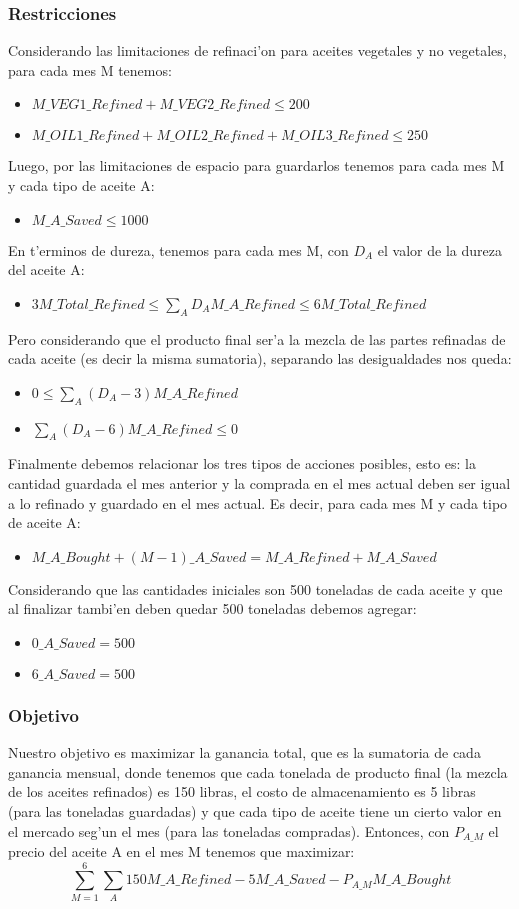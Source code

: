 \subsubsection{Restricciones}
Considerando las limitaciones de refinaci'on para aceites vegetales y no vegetales, para cada mes M tenemos:
\begin{itemize}
\item$M\_VEG1\_Refined + M\_VEG2\_Refined \leq 200$
\item$M\_OIL1\_Refined + M\_OIL2\_Refined + M\_OIL3\_Refined \leq 250$
\end{itemize}
Luego, por las limitaciones de espacio para guardarlos tenemos para cada mes M y cada tipo de aceite A:
\begin{itemize}
\item$M\_A\_Saved \leq 1000$
\end{itemize}
En t'erminos de dureza, tenemos para cada mes M, con $D_A$ el valor de la dureza del aceite A:
\begin{itemize}
\item$3 M\_Total\_Refined \leq  \sum_{A}^{} D_{A} M\_A\_Refined \leq 6 M\_Total\_Refined$
\end{itemize}
Pero considerando que el producto final ser'a la mezcla de las partes refinadas de cada aceite (es decir la misma sumatoria), separando las desigualdades nos queda:
\begin{itemize}
\item$0 \leq  \sum_{A}^{} (D_{A} - 3) M\_A\_Refined$
\item$\sum_{A}^{} (D_{A} - 6) M\_A\_Refined \leq 0$
\end{itemize}
Finalmente debemos relacionar los tres tipos de acciones posibles, esto es: la cantidad guardada el mes anterior y la comprada en el mes actual deben ser igual a lo refinado y guardado en el mes actual. Es decir, para cada mes M y cada tipo de aceite A:
\begin{itemize}
\item$M\_A\_Bought + (M-1)\_A\_Saved = M\_A\_Refined + M\_A\_Saved$
\end{itemize}
Considerando que las cantidades iniciales son 500 toneladas de cada aceite y que al finalizar tambi'en deben quedar 500 toneladas debemos agregar:
\begin{itemize}
\item$0\_A\_Saved = 500$
\item$6\_A\_Saved = 500$
\end{itemize}
\subsubsection{Objetivo}
Nuestro objetivo es maximizar la ganancia total, que es la sumatoria de cada ganancia mensual, donde tenemos que cada tonelada de producto final (la mezcla de los aceites refinados) es 150 libras, el costo de almacenamiento es 5 libras (para las toneladas guardadas) y que cada tipo de aceite tiene un cierto valor en el mercado seg'un el mes (para las toneladas compradas). Entonces, con $P_{A\_M}$ el precio del aceite A en el mes M tenemos que maximizar:
$$\sum_{M=1}^{6} \sum_{A}^{} 150 M\_A\_Refined - 5 M\_A\_Saved - P_{A\_M} M\_A\_Bought$$
